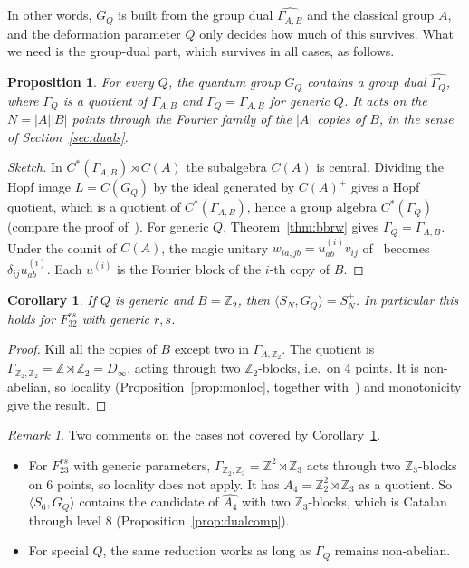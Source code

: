 \documentclass[11pt]{amsart}
\newtheorem{proposition}[theorem]{Proposition}
\newtheorem{corollary}[theorem]{Corollary}
\theoremstyle{definition}
\theoremstyle{remark}
\newtheorem{remark}[theorem]{Remark}
\theoremstyle{plain}
\numberwithin{equation}{section}
\numberwithin{table}{section}
\newcommand{\Z}{\mathbb Z}
\begin{document}
In other words, $G_Q$ is built from the group dual $\widehat{\Gamma_{A,B}}$ and the classical group $A$, and the deformation parameter $Q$ only decides how much of this survives. What we need is the group-dual part, which survives in all cases, as follows.

\begin{proposition}\label{prop:dual}
For every $Q$, the quantum group $G_Q$ contains a group dual $\widehat{\Gamma_Q}$, where $\Gamma_Q$ is a quotient of $\Gamma_{A,B}$ and $\Gamma_Q=\Gamma_{A,B}$ for generic $Q$. It acts on the $N=|A||B|$ points through the Fourier family of the $|A|$ copies of $B$, in the sense of Section~\ref{sec:duals}.
\end{proposition}

\begin{proof}[Sketch]
In $C^*(\Gamma_{A,B})\rtimes C(A)$ the subalgebra $C(A)$ is central. Dividing the Hopf image $L=C(G_Q)$ by the ideal generated by $C(A)^+$ gives a Hopf quotient, which is a quotient of $C^*(\Gamma_{A,B})$, hence a group algebra $C^*(\Gamma_Q)$ (compare the proof of~\cite[Lemma~4.5]{bbrw}). For generic $Q$, Theorem~\ref{thm:bbrw} gives $\Gamma_Q=\Gamma_{A,B}$. Under the counit of $C(A)$, the magic unitary $w_{ia,jb}=u^{(i)}_{ab}v_{ij}$ of~\cite[Lemma~3.8]{bbrw} becomes $\delta_{ij}u^{(i)}_{ab}$. Each $u^{(i)}$ is the Fourier block of the $i$-th copy of $B$.
\end{proof}

\begin{corollary}\label{cor:fx2}
If $Q$ is generic and $B=\Z_2$, then $\langle S_N,G_Q\rangle=S_N^+$. In particular this holds for $F_{32}^{rs}$ with generic $r,s$.
\end{corollary}

\begin{proof}
Kill all the copies of $B$ except two in $\Gamma_{A,\Z_2}$. The quotient is $\Gamma_{\Z_2,\Z_2}=\Z\rtimes\Z_2=D_\infty$, acting through two $\Z_2$-blocks, i.e.\ on $4$ points. It is non-abelian, so locality (Proposition~\ref{prop:monloc}, together with~\cite[Cor.~3.4]{bcf}) and monotonicity give the result.
\end{proof}

\begin{remark}
Two comments on the cases not covered by Corollary~\ref{cor:fx2}.
\begin{itemize}
\item For $F_{23}^{rs}$ with generic parameters, $\Gamma_{\Z_2,\Z_3}=\Z^2\rtimes\Z_3$ acts through two $\Z_3$-blocks on $6$ points, so locality does not apply. It has $A_4=\Z_2^2\rtimes\Z_3$ as a quotient. So $\langle S_6,G_Q\rangle$ contains the candidate of $\widehat{A_4}$ with two $\Z_3$-blocks, which is Catalan through level $8$ (Proposition~\ref{prop:dualcomp}).
\item For special $Q$, the same reduction works as long as $\Gamma_Q$ remains non-abelian.
\end{itemize}
\end{remark}
\end{document}
